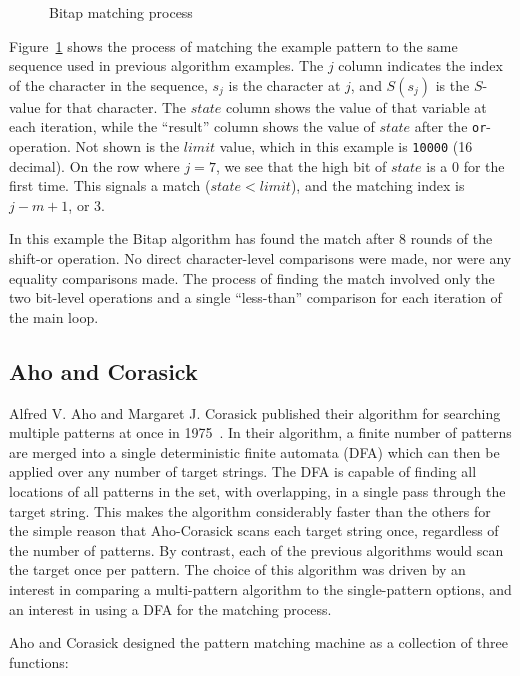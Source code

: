 \begin{figure}[ht]
\centering

\caption{Bitap matching process}
\label{fig:bitap_matching}
\end{figure}

Figure~\ref{fig:bitap_matching} shows the process of matching the example pattern to the same sequence used in previous algorithm examples. The $j$ column indicates the index of the character in the sequence, $s_j$ is the character at $j$, and $S(s_j)$ is the $S$-value for that character. The $state$ column shows the value of that variable at each iteration, while the ``result'' column shows the value of $state$ after the \texttt{or}-operation. Not shown is the $limit$ value, which in this example is \texttt{10000} (16 decimal). On the row where $j = 7$, we see that the high bit of $state$ is a 0 for the first time. This signals a match ($state < limit$), and the matching index is $j - m + 1$, or 3.

In this example the Bitap algorithm has found the match after 8 rounds of the shift-or operation. No direct character-level comparisons were made, nor were any equality comparisons made. The process of finding the match involved only the two bit-level operations and a single ``less-than'' comparison for each iteration of the main loop.

\subsection{Aho and Corasick}

Alfred V. Aho and Margaret J. Corasick published their algorithm for searching multiple patterns at once in 1975~\cite{aho.corasick.1975}. In their algorithm, a finite number of patterns are merged into a single deterministic finite automata (DFA) which can then be applied over any number of target strings. The DFA is capable of finding all locations of all patterns in the set, with overlapping, in a single pass through the target string. This makes the algorithm considerably faster than the others for the simple reason that Aho-Corasick scans each target string once, regardless of the number of patterns. By contrast, each of the previous algorithms would scan the target once per pattern. The choice of this algorithm was driven by an interest in comparing a multi-pattern algorithm to the single-pattern options, and an interest in using a DFA for the matching process.

Aho and Corasick designed the pattern matching machine as a collection of three functions:

